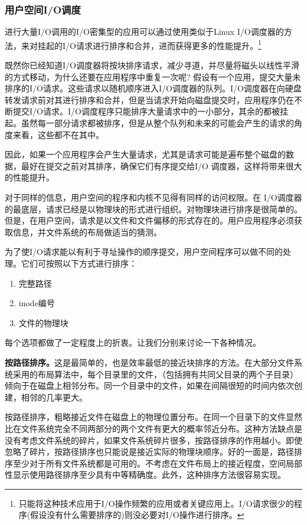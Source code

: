 \subsubsection{用户空间I/O调度}

进行大量I/O调用的I/O密集型的应用可以通过使用类似于Linux I/O调度器的方法，来对挂起的I/O请求进行排序和合并，进而获得更多的性能提升。\footnote[1]{只能将这种技术应用于I/O操作频繁的应用或者关键应用上。I/O请求很少的程序(假设没有什么需要排序的)则没必要对I/O操作进行排序。}

既然你已经知道I/O调度器将按块排序请求，减少寻道，并尽量将磁头以线性平滑的方式移动，为什么还要在应用程序中重复一次呢? 假设有一个应用，提交大量未排序的I/O请求。这些请求以随机顺序进入I/O调度器的队列。I/O调度器在向硬盘转发请求前对其进行排序和合并，但是当请求开始向磁盘提交时，应用程序仍在不断提交I/O请求。I/O调度程序只能排序大量请求中的一小部分，其余的都被挂起。虽然每一部分请求都被排序，但是从整个队列和未来的可能会产生的请求的角度来看，这些都不在其中。

因此，如果一个应用程序会产生大量请求，尤其是请求可能是遍布整个磁盘的数据，最好在提交之前对其排序，确保它们有序提交给I/O 调度器，这样将带来很大的性能提升。
     
对于同样的信息，用户空间的程序和内核不见得有同样的访问权限。在 I/O调度器的最底层，请求已经是以物理块的形式进行组织。对物理块进行排序是很简单的。但是，在用户空间，请求是以文件和文件偏移的形式存在的。用户应用程序必须获取信息，并文件系统的布局做适当的猜测。
     
为了使I/O请求能以有利于寻址操作的顺序提交，用户空间程序可以做不同的处理。它们可按照以下方式进行排序：

\begin{enumerate}
\item 完整路径
\item inode编号
\item 文件的物理块
\end{enumerate}

每个选项都做了一定程度上的折衷。让我们分别来讨论一下各种情况。

\textbf{按路径排序。}这是最简单的，也是效率最低的接近块排序的方法。在大部分文件系统采用的布局算法中，每个目录里的文件，（包括拥有共同父目录的两个子目录）倾向于在磁盘上相邻分布。同一个目录中的文件，如果在间隔很短的时间内依次创建，相邻的几率更大。
  
按路径排序，粗略接近文件在磁盘上的物理位置分布。在同一个目录下的文件显然比在文件系统完全不同两部分的两个文件有更大的概率邻近分布。这种方法缺点是没有考虑文件系统的碎片，如果文件系统碎片很多，按路径排序的作用越小。即使忽略了碎片，按路径排序也只能说是接近实际的物理块顺序。好的一面是，路径排序至少对于所有文件系统都是可用的。不考虑在文件布局上的接近程度，空间局部性显示使用路径排序至少具有中等精确度。此外，这种排序方法很容易实现。

